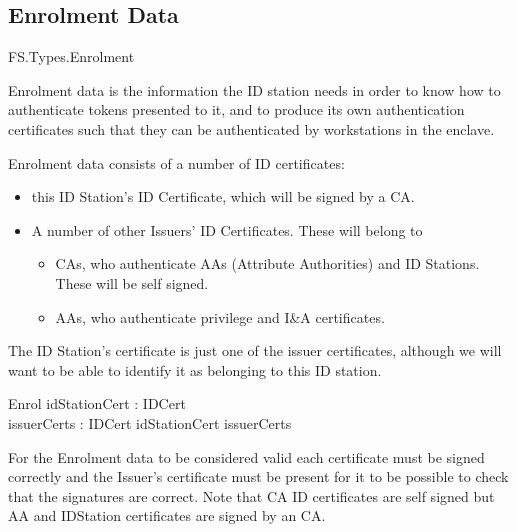 \subsection{Enrolment Data}

\begin{traceunit}{FS.Types.Enrolment}
\end{traceunit}
Enrolment data is the information the ID station needs in order to
know how to authenticate tokens presented to it, and to produce its
own authentication certificates such that they can be authenticated by
workstations in the enclave.

Enrolment data consists of a number of ID certificates: 
\begin{itemize}
\item
this ID Station's ID Certificate, which will be signed by a CA.
\item
A number of other Issuers' ID Certificates. These will belong to 
        \begin{itemize}
        \item
        CAs, who authenticate AAs (Attribute Authorities) and ID Stations. These will be self signed.
        \item
        AAs, who authenticate privilege and I\&A certificates. 
        \end{itemize}
\end{itemize}

The ID Station's certificate is just one of the issuer certificates,
although we will want to be able to identify it as belonging to this
ID station. 

\begin{schema}{Enrol}
        idStationCert : IDCert
\\      issuerCerts : \power IDCert
\where
        idStationCert \in issuerCerts
\end{schema}

For the Enrolment data to be considered valid each certificate must be
signed correctly and the Issuer's certificate must be present for it
to be possible to check that the signatures are correct.
Note that CA ID
certificates are self signed but AA and IDStation certificates are
signed by an CA.

